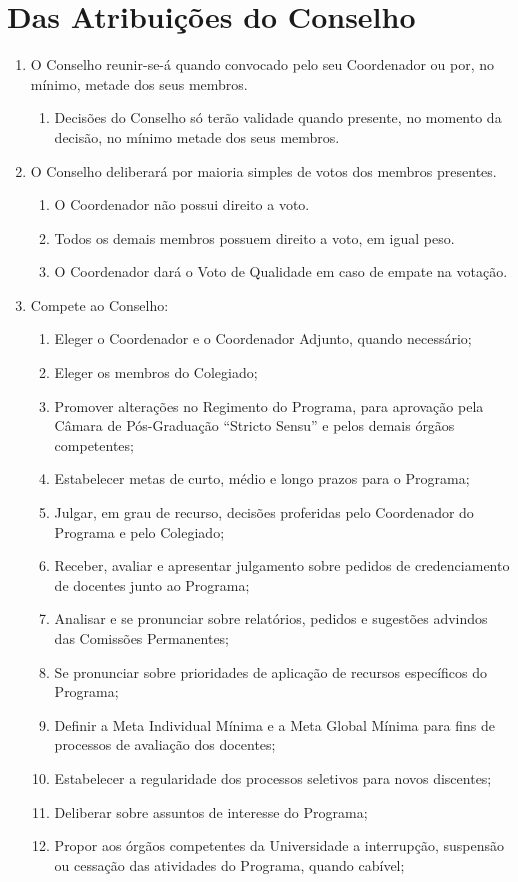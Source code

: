 \documentclass{article}
\newcommand{\singleitem}{\item[Parágrafo Único.]}
\newcommand{\grupoMenor}{Colegiado\xspace}
\newcommand{\grupoMaior}{Conselho\xspace}
\begin{document}
\section{Das Atribuições do \grupoMaior}
\begin{enumerate}

	\item O \grupoMaior reunir-se-á quando convocado pelo seu Coordenador ou por, no mínimo, metade dos seus membros.
	\begin{enumerate}
		\singleitem Decisões do \grupoMaior só terão validade quando presente, no momento da decisão, no mínimo metade dos seus membros.
	\end{enumerate}

	\item O \grupoMaior deliberará por maioria simples de votos dos membros presentes.
	\begin{enumerate}
		\item O Coordenador não possui direito a voto.
		\item Todos os demais membros possuem direito a voto, em igual peso.
		\item O Coordenador dará o Voto de Qualidade em caso de empate na votação. 
	\end{enumerate}

	\item Compete ao \grupoMaior:
	\begin{enumerate}[label=\Roman*]
		\item Eleger o Coordenador e o Coordenador Adjunto, quando necessário;
		\item Eleger os membros do \grupoMenor;
		\item Promover alterações no Regimento do Programa, para aprovação pela Câmara de Pós-Graduação ``Stricto Sensu'' e pelos demais órgãos competentes;
		\item Estabelecer metas de curto, médio e longo prazos para o Programa;
		\item Julgar, em grau de recurso, decisões proferidas pelo Coordenador do Programa e pelo \grupoMenor;
		\item Receber, avaliar e apresentar julgamento sobre pedidos de credenciamento de docentes junto ao Programa;
		\item Analisar e se pronunciar sobre relatórios, pedidos e sugestões advindos das Comissões Permanentes;
		\item Se pronunciar sobre prioridades de aplicação de recursos específicos do Programa;
		\item Definir a Meta Individual Mínima e a Meta Global Mínima para fins de processos de avaliação dos docentes;
		\item Estabelecer a regularidade dos processos seletivos para novos discentes;
		\item Deliberar sobre assuntos de interesse do Programa;		
		\item Propor aos órgãos competentes da Universidade a interrupção, suspensão ou cessação das atividades do Programa, quando cabível;
	\end{enumerate}


\end{enumerate}
\end{document}
